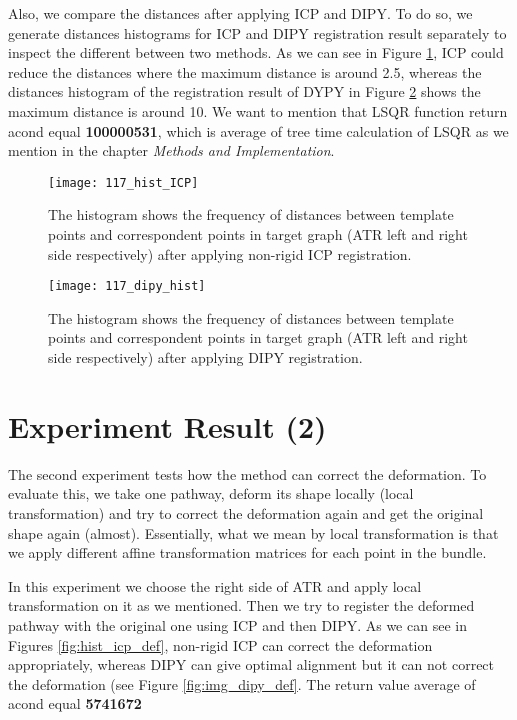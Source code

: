 \documentclass[../structure.tex]{subfiles}
\begin{document}
Also, we compare the distances after applying ICP and DIPY. To do so, we generate distances histograms for ICP and DIPY registration result separately to inspect the different between two methods. As we can see in Figure \ref{fig:hist_ICP}, ICP could reduce the distances where the maximum distance is around 2.5, whereas the distances histogram of the registration result of DYPY in Figure \ref{fig:hist_dipy} shows the maximum distance is around 10. We want to mention that LSQR function return acond equal \textbf{100000531}, which is average of tree time calculation of LSQR as we mention in the chapter \textit{Methods and Implementation}.

\begin{figure}[H]
\centering
\texttt{[image: 117\_hist\_ICP]}
\captionsetup{justification=centering}
\caption{The histogram shows the frequency of distances between template points and correspondent points in target graph (ATR left and right side respectively) after applying non-rigid ICP registration.}
\label{fig:hist_ICP}
\end{figure}

\begin{figure}[H]
\centering
\texttt{[image: 117\_dipy\_hist]}
\captionsetup{justification=centering}
\caption{The histogram shows the frequency of distances between template points and correspondent points in target graph (ATR left and right side respectively) after applying DIPY registration.}
\label{fig:hist_dipy}
\end{figure}

\section{Experiment Result (2)}
The second experiment tests how the method can correct the deformation. To evaluate this, we take one pathway, deform its shape locally (local transformation) and try to correct the deformation again and get the original shape again (almost). Essentially, what we mean by local transformation is that we apply different affine transformation matrices for each point in the bundle. 

In this experiment we choose the right side of ATR and apply local transformation on it as we mentioned. Then we try to register the deformed pathway with the original one using ICP and then DIPY. As we can see in Figures \ref{fig:hist_icp_def}, non-rigid ICP can correct the deformation appropriately, whereas DIPY can give optimal alignment but it can not correct the deformation (see Figure \ref{fig:img_dipy_def}. The return value average of acond equal \textbf{5741672}
\end{document}

